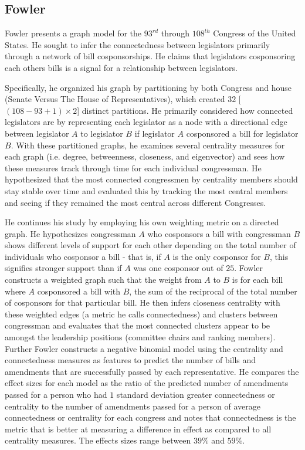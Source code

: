 \subsection{Fowler}

Fowler presents a graph model for the $93^{rd}$ through $108^{th}$ Congress of the United 
States. He sought to infer the connectedness between legislators primarily 
through a network of bill cosponsorships. He claims that legislators 
cosponsoring each others bills is a signal for a relationship between legislators.

Specifically, he organized his graph by partitioning by both Congress and house 
(Senate Versus The House of Representatives), which created $32$ 
[$(108 - 93 + 1) \times 2$] distinct partitions. He primarily considered how 
connected legislators are by representing each legislator as a node with a 
directional edge between legislator $A$ to legislator $B$ if legislator $A$ 
cosponsored a bill for legislator $B$. With these partitioned graphs, he 
examines several centrality measures for each graph (i.e. degree, betweenness, 
closeness, and eigenvector) and sees how these measures track through time for 
each individual congressman. He hypothesized that the most connected 
congressmen by centrality members should stay stable over time and evaluated 
this by tracking the most central members and seeing if they remained the 
most central across different Congresses.

He continues his study by employing his own weighting metric on a directed 
graph. He hypothesizes congressman $A$ who cosponsors a bill with congressman 
$B$ shows different levels of support for each other depending on the total 
number of individuals who cosponsor a bill - that is, if $A$ is the only 
cosponsor for $B$, this signifies stronger support than if $A$ was one 
cosponsor out of $25$. Fowler constructs a weighted graph such that the weight 
from $A$ to $B$ is for each bill where $A$ cosponsored a bill with $B$, the 
sum of the reciprocal of the total number of cosponsors for that particular 
bill. He then infers closeness centrality with these weighted edges (a metric 
he calls connectedness) and clusters between congressman and evaluates that the 
most connected clusters appear to be amongst the leadership positions 
(committee chairs and ranking members). Further Fowler constructs a negative 
binomial model using the centrality and connectedness measures as features to 
predict the number of bills and amendments that are successfully passed by each 
representative. He compares the effect sizes for each model as the ratio of the 
predicted number of amendments passed for a person who had $1$ standard 
deviation greater connectedness or centrality to the  number of amendments 
passed for a person of average connectedness or centrality for each congress 
and notes that connectedness is the metric that is better at measuring a 
difference in effect as compared to all centrality measures. The effects sizes 
range between $39\%$ and $59\%$.

